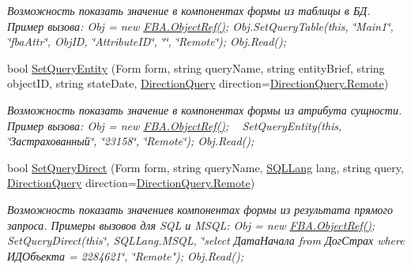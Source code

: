 \begin{DoxyCompactItemize}
\begin{DoxyCompactList}\small\item\em Возможность показать значение в компонентах формы из таблицы в БД. Пример вызова\+: Obj = new \mbox{\hyperlink{class_f_b_a_1_1_object_ref}{F\+B\+A.\+Object\+Ref()}}; Obj.\+Set\+Query\+Table(this, \char`\"{}\+Main1\char`\"{}, \char`\"{}fba\+Attr\char`\"{}, Obj\+ID, \char`\"{}\+Attribute\+I\+D\char`\"{}, \char`\"{}\char`\"{}, \char`\"{}\+Remote\char`\"{}); Obj.\+Read(); ~\newline
\end{DoxyCompactList}\item 
bool \mbox{\hyperlink{class_f_b_a_1_1_object_ref_a040cf96d911897aa92686ec1761b1219}{Set\+Query\+Entity}} (Form form, string query\+Name, string entity\+Brief, string object\+ID, string state\+Date, \mbox{\hyperlink{namespace_f_b_a_a6ff7d5c242d98046d1980715b06d7300}{Direction\+Query}} direction=\mbox{\hyperlink{namespace_f_b_a_a6ff7d5c242d98046d1980715b06d7300af8508f576cd3f742dfc268258dcdf0dd}{Direction\+Query.\+Remote}})
\begin{DoxyCompactList}\small\item\em Возможность показать значение в компонентах формы из атрибута сущности. Пример вызова\+: Obj = new \mbox{\hyperlink{class_f_b_a_1_1_object_ref}{F\+B\+A.\+Object\+Ref()}}; ~\newline
Set\+Query\+Entity(this, \char`\"{}Застрахованный\char`\"{}, \char`\"{}23158\char`\"{}, \char`\"{}\+Remote\char`\"{}); Obj.\+Read(); ~\newline
\end{DoxyCompactList}\item 
bool \mbox{\hyperlink{class_f_b_a_1_1_object_ref_a07aab7e5b71aeada14affe1c90a10c79}{Set\+Query\+Direct}} (Form form, string query\+Name, \mbox{\hyperlink{namespace_f_b_a_aa7137ed2c5f5027f13bb403ffc2b005e}{S\+Q\+L\+Lang}} lang, string query, \mbox{\hyperlink{namespace_f_b_a_a6ff7d5c242d98046d1980715b06d7300}{Direction\+Query}} direction=\mbox{\hyperlink{namespace_f_b_a_a6ff7d5c242d98046d1980715b06d7300af8508f576cd3f742dfc268258dcdf0dd}{Direction\+Query.\+Remote}})
\begin{DoxyCompactList}\small\item\em Возможность показать значениев компонентах формы из результата прямого запроса. Примеры вызовов для S\+QL и M\+S\+QL\+: Obj = new \mbox{\hyperlink{class_f_b_a_1_1_object_ref}{F\+B\+A.\+Object\+Ref()}}; ~\newline
Set\+Query\+Direct(this\char`\"{}, S\+Q\+L\+Lang.\+M\+S\+Q\+L, \char`\"{}select ДатаНачала from ДогСтрах where ИДОбъекта = 2284621\char`\"{}, \char`\"{}Remote"); Obj.\+Read(); ~\newline

\end{DoxyCompactList}
\end{DoxyCompactItemize}
